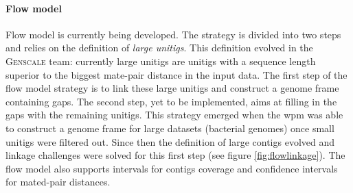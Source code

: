 \documentclass[12pt]{article}
\begin{document}
\paragraph*{Flow model} Flow model is currently being developed. The strategy is divided into two steps and relies on the definition of \textit{large unitigs}. This definition evolved in the \textsc{Genscale} team: currently large unitigs are unitigs with a sequence length superior to the biggest mate-pair distance in the input data. The first step of the flow model strategy is to link these large unitigs and construct a genome frame containing gaps. The second step, yet to be implemented, aims at filling in the gaps with the remaining unitigs. This strategy emerged when the wpm was able to construct a genome frame for large datasets (bacterial genomes) once small unitigs were filtered out. Since then the definition of large contigs evolved and linkage challenges were solved for this first step (see figure \ref{fig:flowlinkage}). The flow model also supports intervals for contigs coverage and confidence intervals for mated-pair distances.

\end{document}
